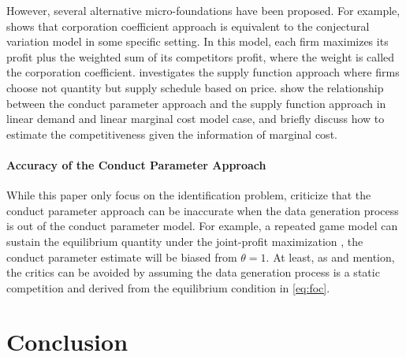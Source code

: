 \documentclass[11pt, a4paper]{article}
\theoremstyle{remark}
\begin{document}
However, several alternative micro-foundations have been proposed.
For example, \citet{escrihuela-villarNote2015} shows that corporation coefficient approach is equivalent to the conjectural variation model in some specific setting.
In this model, each firm maximizes its profit plus the weighted sum of its competitors profit, where the weight is called the corporation coefficient.
\citet{menezesStrategic2020} investigates the supply function approach where firms choose not quantity but supply schedule based on price.
\citet{menezesCompetition2023} show the relationship between the conduct parameter approach and the supply function approach in linear demand and linear marginal cost model case, and \citet{menezesStrategic2020} briefly discuss how to estimate the competitiveness given the information of marginal cost.



\paragraph{Accuracy of the Conduct Parameter Approach}
While this paper only focus on the identification problem, \citet{cortsConduct1999} criticize that the conduct parameter approach can be inaccurate when the data generation process is out of the conduct parameter model.
For example, a repeated game model can sustain the equilibrium quantity under the joint-profit maximization , the conduct parameter estimate will be biased from $\theta = 1$.
At least, as \citet{cortsConduct1999} and \citet{magnolfiComparison2022} mention, the critics can be avoided by assuming the data generation process is a static competition and derived from the equilibrium condition in \eqref{eq:foc}.


\section{Conclusion}\label{sec:conclusion}
\end{document}
